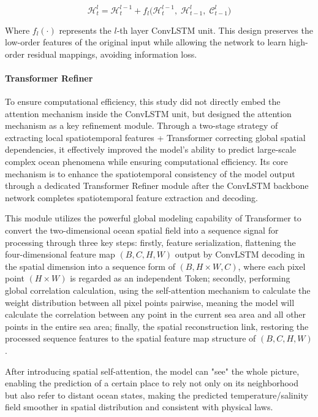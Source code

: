 \documentclass[webpdf,contemporary,large]{oup-authoring-template}
\begin{document}
\begin{equation}
\mathcal{H}^l_t = \mathcal{H}^{l-1}_t + f_l \bigl( \mathcal{H}^{l-1}_t,\; \mathcal{H}^l_{t-1},\; \mathcal{C}^l_{t-1} \bigr)
\end{equation}

Where $f_l(\cdot)$ represents the $l$-th layer ConvLSTM unit. This design preserves the low-order features of the original input while allowing the network to learn high-order residual mappings, avoiding information loss. 

\paragraph{Transformer Refiner}

To ensure computational efficiency, this study did not directly embed the attention mechanism inside the ConvLSTM unit, but designed the attention mechanism as a key refinement module. Through a two-stage strategy of extracting local spatiotemporal features + Transformer correcting global spatial dependencies, it effectively improved the model's ability to predict large-scale complex ocean phenomena while ensuring computational efficiency. Its core mechanism is to enhance the spatiotemporal consistency of the model output through a dedicated Transformer Refiner module after the ConvLSTM backbone network completes spatiotemporal feature extraction and decoding.

This module utilizes the powerful global modeling capability of Transformer to convert the two-dimensional ocean spatial field into a sequence signal for processing through three key steps: firstly, feature serialization, flattening the four-dimensional feature map $(B,C,H,W)$ output by ConvLSTM decoding in the spatial dimension into a sequence form of $(B, H \times W, C)$, where each pixel point $(H \times W)$ is regarded as an independent Token; secondly, performing global correlation calculation, using the self-attention mechanism to calculate the weight distribution between all pixel points pairwise, meaning the model will calculate the correlation between any point in the current sea area and all other points in the entire sea area; finally, the spatial reconstruction link, restoring the processed sequence features to the spatial feature map structure of $(B,C,H,W)$.

After introducing spatial self-attention, the model can "see" the whole picture, enabling the prediction of a certain place to rely not only on its neighborhood but also refer to distant ocean states, making the predicted temperature/salinity field smoother in spatial distribution and consistent with physical laws. 
\end{document}
